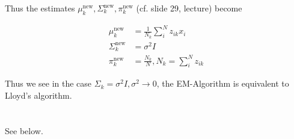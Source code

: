 \documentclass[11pt]{article}
\newcommand{\exercise}{\section{}}
\newcommand{\sumf}[3]{\sum_{#1}^{#2} #3}
\begin{document}
\noindent Thus the estimates $\mu_k^{\text{new}}, \Sigma_k^{\text{new}}, \pi_k^{\text{new}} $ (cf. slide 29, lecture) become

\begin{align*}
\mu_k^{\text{new}} &= \frac{1}{N_k} \sumf{i}{N}{z_{ik} x_i} \\
\Sigma_k^{\text{new}} &= \sigma^2 I \tag{by 2.1 this parameter stays the same as initialized in the beginning} \\
\pi_k^{\text{new}} &= \frac{N_k}{N}, N_k = \sumf{i}{N}{z_{ik}}
\end{align*}

\noindent Thus we see in the case $\Sigma_k = \sigma^2 I, \sigma^2 \rightarrow 0$, the EM-Algorithm is equivalent to Lloyd's algorithm.

\exercise

See below.
\end{document}
